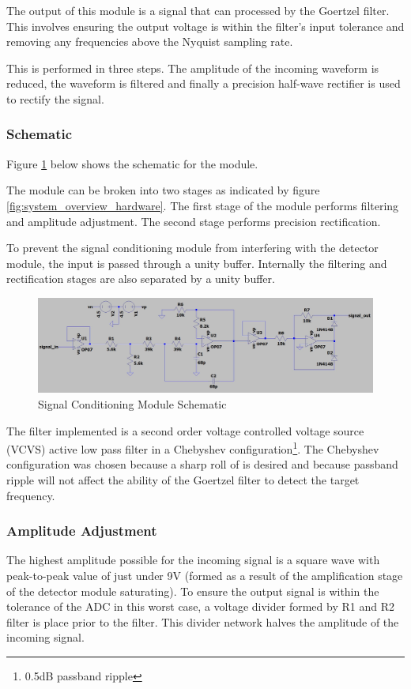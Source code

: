 The output of this module is a signal that can processed by the Goertzel filter. This involves ensuring the output voltage is within the filter's input tolerance and removing any frequencies above the Nyquist sampling rate.

This is performed in three steps. The amplitude of the incoming waveform is reduced, the waveform is filtered and finally a precision half-wave rectifier is used to rectify the signal.

\subsubsection{Schematic}
Figure \ref{fig:schematic_filter_and_rectify} below shows the schematic for the module.

The module can be broken into two stages as indicated by figure \ref{fig:system_overview_hardware}. The first stage of the module performs filtering and amplitude adjustment. The second stage performs precision rectification.

To prevent the signal conditioning module from interfering with the detector module, the input is passed through a unity buffer. Internally the filtering and rectification stages are also separated by a unity buffer.

\begin{figure}[H]
	\centering
	\includegraphics[width=\textwidth]{figures/design/filter_and_rectify}
	\caption{Signal Conditioning Module Schematic}
	\label{fig:schematic_filter_and_rectify}
\end{figure}

The filter implemented is a second order voltage controlled voltage source (VCVS) active low pass filter in a Chebyshev configuration\footnote{0.5dB passband ripple}. The Chebyshev configuration was chosen because a sharp roll of is desired and because passband ripple will not affect the ability of the Goertzel filter to detect the target frequency.


\subsubsection{Amplitude Adjustment}
The highest amplitude possible for the incoming signal is a square wave with peak-to-peak value of just under 9V (formed as a result of the amplification stage of the detector module saturating). To ensure the output signal is within the tolerance of the ADC in this worst case, a voltage divider formed by R1 and R2 filter is place prior to the filter. This divider network halves the amplitude of the incoming signal.

